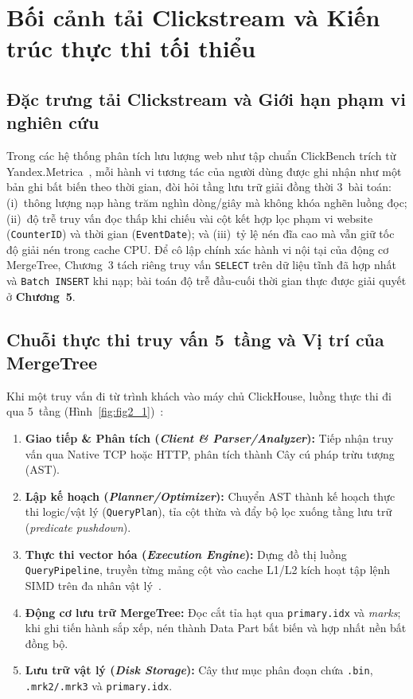 \documentclass[13pt,a4paper]{report}
\begin{document}
\section{Bối cảnh tải Clickstream và Kiến trúc thực thi tối thiểu}
\subsection{Đặc trưng tải Clickstream và Giới hạn phạm vi nghiên cứu}
Trong các hệ thống phân tích lưu lượng web như tập chuẩn ClickBench trích từ Yandex.Metrica~\cite{B4, B5}, mỗi hành vi tương tác của người dùng được ghi nhận như một bản ghi bất biến theo thời gian, đòi hỏi tầng lưu trữ giải đồng thời 3~bài toán: (i)~thông lượng nạp hàng trăm nghìn dòng/giây mà không khóa nghẽn luồng đọc; (ii)~độ trễ truy vấn đọc thấp khi chiếu vài cột kết hợp lọc phạm vi website (\texttt{CounterID}) và thời gian (\texttt{EventDate}); và (iii)~tỷ lệ nén đĩa cao mà vẫn giữ tốc độ giải nén trong cache CPU. Để cô lập chính xác hành vi nội tại của động cơ MergeTree, Chương~3 tách riêng truy vấn \texttt{SELECT} trên dữ liệu tĩnh đã hợp nhất và \texttt{Batch INSERT} khi nạp; bài toán độ trễ đầu-cuối thời gian thực được giải quyết ở \textbf{Chương~5}.

\subsection{Chuỗi thực thi truy vấn 5~tầng và Vị trí của MergeTree}
Khi một truy vấn đi từ trình khách vào máy chủ ClickHouse, luồng thực thi đi qua 5~tầng (Hình~\ref{fig:fig2_1})~\cite{A1, S2}:
\begin{enumerate}
    \setlength{\itemsep}{3pt}\setlength{\parskip}{0pt}
    \item \textbf{Giao tiếp \& Phân tích (\textit{Client \& Parser/Analyzer}):} Tiếp nhận truy vấn qua Native TCP hoặc HTTP, phân tích thành Cây cú pháp trừu tượng (AST).
    \item \textbf{Lập kế hoạch (\textit{Planner/Optimizer}):} Chuyển AST thành kế hoạch thực thi logic/vật lý (\texttt{QueryPlan}), tỉa cột thừa và đẩy bộ lọc xuống tầng lưu trữ (\textit{predicate pushdown}).
    \item \textbf{Thực thi vector hóa (\textit{Execution Engine}):} Dựng đồ thị luồng \texttt{QueryPipeline}, truyền từng mảng cột vào cache L1/L2 kích hoạt tập lệnh SIMD trên đa nhân vật lý~\cite{A1}.
    \item \textbf{Động cơ lưu trữ MergeTree:} Đọc cắt tỉa hạt qua \texttt{primary.idx} và \textit{marks}; khi ghi tiến hành sắp xếp, nén thành Data Part bất biến và hợp nhất nền bất đồng bộ.
    \item \textbf{Lưu trữ vật lý (\textit{Disk Storage}):} Cây thư mục phân đoạn chứa \texttt{.bin}, \texttt{.mrk2/\allowbreak{}.mrk3} và \texttt{primary.idx}.
\end{enumerate}
\end{document}
